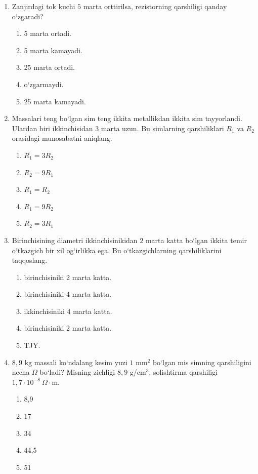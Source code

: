\begin{enumerate}
\item Zanjirdagi tok kuchi $5$ marta orttirilsa, rezistorning qarshiligi qanday o‘zgaradi?
\begin{enumerate}[label=\Alph*)]
\item 5 marta ortadi.
\item 5 marta kamayadi.
\item 25 marta ortadi.
\item o‘zgarmaydi.
\item 25 marta kamayadi.
\end{enumerate}

\item Massalari teng bo‘lgan sim teng ikkita metallikdan ikkita sim tayyorlandi. Ulardan biri ikkinchisidan $3$ marta uzun. Bu simlarning qarshiliklari $R_1$ va $R_2$ orasidagi munosabatni aniqlang.
\begin{enumerate}[label=\Alph*)]
\item $R_1=3R_2$
\item $R_2=9R_1$
\item $R_1=R_2$
\item $R_1=9R_2$
\item $R_2=3R_1$
\end{enumerate}

\item Birinchisining diametri ikkinchisinikidan $2$ marta katta bo‘lgan ikkita temir o‘tkazgich bir xil og‘irlikka ega. Bu o‘tkazgichlarning qarshiliklarini taqqoslang.
\begin{enumerate}[label=\Alph*)]
\item birinchisiniki 2 marta katta.
\item birinchisiniki 4 marta katta.
\item ikkinchisiniki 4 marta katta.
\item birinchisiniki 2 marta katta.
\item TJY.
\end{enumerate}

\item $8,9$ kg massali ko‘ndalang kesim yuzi $1$ mm$^2$ bo‘lgan mis simning qarshiligini necha $\Omega$ bo‘ladi? Misning zichligi $8,9$ g/cm$^3$, solishtirma qarshiligi $1,7\cdot10^{-8}~\Omega\cdot$m.
\begin{enumerate}[label=\Alph*)]
\item 8,9
\item 17
\item 34
\item 44,5
\item 51
\end{enumerate}


\end{enumerate}

